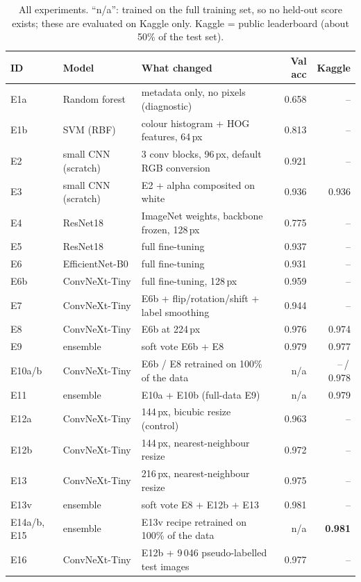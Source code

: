 \documentclass[11pt,a4paper]{article}
\begin{document}
\begin{table}[h]
\centering\small
\begin{tabularx}{\linewidth}{llXrr}
\toprule
ID & Model & What changed & Val acc & Kaggle \\
\midrule
E1a & Random forest & metadata only, no pixels (diagnostic) & 0.658 & -- \\
E1b & SVM (RBF) & colour histogram + HOG features, 64\,px & 0.813 & -- \\
E2  & small CNN (scratch) & 3 conv blocks, 96\,px, default RGB conversion & 0.921 & -- \\
E3  & small CNN (scratch) & E2 + alpha composited on white & 0.936 & 0.936 \\
E4  & ResNet18 & ImageNet weights, backbone frozen, 128\,px & 0.775 & -- \\
E5  & ResNet18 & full fine-tuning & 0.937 & -- \\
E6  & EfficientNet-B0 & full fine-tuning & 0.931 & -- \\
E6b & ConvNeXt-Tiny & full fine-tuning, 128\,px & 0.959 & -- \\
E7  & ConvNeXt-Tiny & E6b + flip/rotation/shift + label smoothing & 0.944 & -- \\
E8  & ConvNeXt-Tiny & E6b at 224\,px & 0.976 & 0.974 \\
E9  & ensemble & soft vote E6b + E8 & 0.979 & 0.977 \\
E10a/b & ConvNeXt-Tiny & E6b / E8 retrained on 100\% of the data & n/a & --\,/\,0.978 \\
E11 & ensemble & E10a + E10b (full-data E9) & n/a & 0.979 \\
E12a & ConvNeXt-Tiny & 144\,px, bicubic resize (control) & 0.963 & -- \\
E12b & ConvNeXt-Tiny & 144\,px, nearest-neighbour resize & 0.972 & -- \\
E13 & ConvNeXt-Tiny & 216\,px, nearest-neighbour resize & 0.975 & -- \\
E13v & ensemble & soft vote E8 + E12b + E13 & 0.981 & -- \\
E14a/b, E15 & ensemble & E13v recipe retrained on 100\% of the data & n/a & \textbf{0.981} \\
E16 & ConvNeXt-Tiny & E12b + 9\,046 pseudo-labelled test images & 0.977 & -- \\
\bottomrule
\end{tabularx}
\caption{All experiments. ``n/a'': trained on the full training set, so no held-out score exists;
these are evaluated on Kaggle only. Kaggle = public leaderboard (about 50\% of the test set).}
\end{table}
\end{document}
